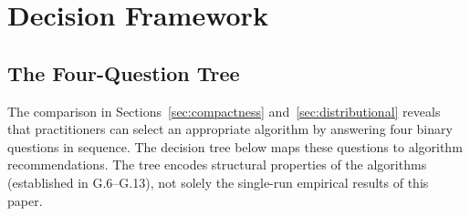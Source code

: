 \section{Decision Framework}
\label{sec:decision}

\subsection{The Four-Question Tree}

The comparison in Sections~\ref{sec:compactness}
and~\ref{sec:distributional} reveals that practitioners can select an
appropriate algorithm by answering four binary questions in sequence.
The decision tree below maps these questions to algorithm recommendations.
The tree encodes structural properties of the algorithms (established in
G.6--G.13), not solely the single-run empirical results of this paper.

